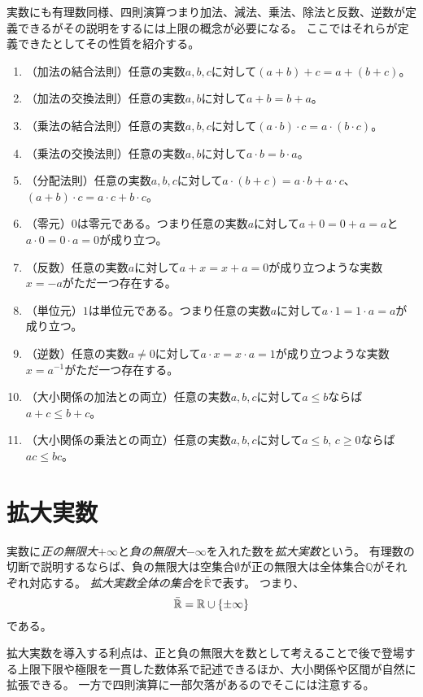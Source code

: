 実数にも有理数同様、四則演算つまり加法、減法、乗法、除法と反数、逆数が定義できるがその説明をするには上限の概念が必要になる。
ここではそれらが定義できたとしてその性質を紹介する。
\begin{enumerate}
\item
（加法の結合法則）任意の実数$a, b, c$に対して$(a+b)+c = a+(b+c)$。
\item
（加法の交換法則）任意の実数$a, b$に対して$a+b = b+a$。
\item
（乗法の結合法則）任意の実数$a, b, c$に対して$(a\cdot b)\cdot c = a\cdot (b\cdot c)$。
\item
（乗法の交換法則）任意の実数$a, b$に対して$a\cdot b = b\cdot a$。
\item
（分配法則）任意の実数$a, b, c$に対して$a\cdot (b+c) = a\cdot b+a\cdot c$、$(a+b)\cdot c = a\cdot c+b\cdot c$。
\item
（零元）$0$は零元である。つまり任意の実数$a$に対して$a+0 = 0+a = a$と$a\cdot 0 = 0\cdot a = 0$が成り立つ。
\item
（反数）任意の実数$a$に対して$a+x = x+a = 0$が成り立つような実数$x = -a$がただ一つ存在する。
\item
（単位元）$1$は単位元である。つまり任意の実数$a$に対して$a\cdot 1 = 1\cdot a = a$が成り立つ。
\item
（逆数）任意の実数$a \ne 0$に対して$a\cdot x = x\cdot a = 1$が成り立つような実数$x = a^{-1}$がただ一つ存在する。
\item
（大小関係の加法との両立）任意の実数$a, b, c$に対して$a \le b$ならば$a+c \le b+c$。
\item
（大小関係の乗法との両立）任意の実数$a, b, c$に対して$a \le b$, $c \ge 0$ならば$a c \le b c$。
\end{enumerate}

\section{拡大実数}

実数に\emph{正の無限大}$+\infty$と\emph{負の無限大}$-\infty$を入れた数を\emph{拡大実数}という。
有理数の切断で説明するならば、負の無限大は空集合$\emptyset$が正の無限大は全体集合$\mathbb{Q}$がそれぞれ対応する。
\emph{拡大実数全体の集合}を$\bar{\mathbb{R}}$で表す。
つまり、
$$
\bar{\mathbb{R}} = \mathbb{R}\cup\{ \pm\infty \}
$$
である。

拡大実数を導入する利点は、正と負の無限大を数として考えることで後で登場する上限下限や極限を一貫した数体系で記述できるほか、大小関係や区間が自然に拡張できる。
一方で四則演算に一部欠落があるのでそこには注意する。

